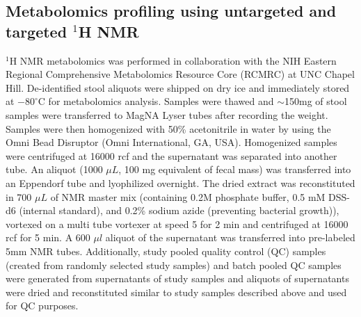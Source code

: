 \subsection{Metabolomics profiling using untargeted and targeted $^1$H NMR}

$^1$H NMR metabolomics was performed in collaboration with the NIH Eastern Regional Comprehensive Metabolomics Resource Core (RCMRC) at UNC Chapel Hill. De-identified stool aliquots were shipped on dry ice and immediately stored at $-80^{\circ}$C for metabolomics analysis. Samples were thawed and $\sim$150mg of stool samples were transferred to MagNA Lyser tubes after recording the weight. Samples were then homogenized with 50\% acetonitrile in water by using the Omni Bead Disruptor (Omni International, GA, USA). Homogenized samples were centrifuged at 16000 rcf and the supernatant was separated into another tube. An aliquot (1000 $\mu L$, 100 mg equivalent of fecal mass) was transferred into an Eppendorf tube and lyophilized overnight. The dried extract was reconstituted in 700 $\mu L$ of NMR master mix (containing 0.2M phosphate buffer, 0.5 mM DSS-d6 (internal standard), and 0.2\% sodium azide (preventing bacterial growth)), vortexed on a multi tube vortexer at speed 5 for 2 min and centrifuged at 16000 rcf for 5 min. A 600 $\mu l$ aliquot of the supernatant was transferred into pre-labeled 5mm NMR tubes. Additionally, study pooled quality control (QC) samples (created from randomly selected study samples) and batch pooled QC samples were generated from supernatants of study samples and aliquots of supernatants were dried and reconstituted similar to study samples described above and used for QC purposes. 

